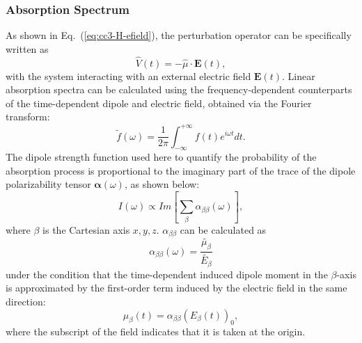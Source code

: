 \subsubsection{Absorption Spectrum} \label{theory-cc3-21}
As shown in Eq.~(\ref{eq:cc3-H-efield}), the perturbation operator can be specifically written as
\begin{equation}
\hat{V}(t) = -\hat{\mu}\cdot \textbf{E}(t),
\end{equation}
with the system interacting with an external electric field $\textbf{E}(t)$. Linear absorption spectra can be calculated using the frequency-dependent counterparts of the time-dependent dipole and electric field, obtained via the Fourier transform:
\begin{equation}
\tilde{f}(\omega) = \frac{1}{2\pi}\int_{-\infty}^{+\infty}f(t)e^{i\omega t}dt.
\end{equation}
The dipole strength function used here to quantify the probability of the absorption process is proportional to the imaginary part of the trace of the dipole polarizability tensor $\boldsymbol{\alpha}(\omega)$, as shown below:
\begin{equation}
I(\omega) \propto Im [\sum_{\beta}\alpha_{\beta \beta}(\omega)],
\end{equation}
where $\beta$ is the Cartesian axis $x, y, z$. $\alpha_{\beta\beta}$ can be calculated as
\begin{equation}
\alpha_{\beta\beta}(\omega) = \frac{\tilde{\mu_{\beta}}}{\tilde{E_{\beta}}} 
\end{equation}
under the condition that the time-dependent induced dipole moment in the $\beta$-axis is approximated by the first-order term induced by the electric field in the same direction:
\begin{equation}
\mu_{\beta}(t) = \alpha_{\beta\beta}(E_{\beta}(t))_{0},
\end{equation}
where the subscript of the field indicates that it is taken at the origin. 

